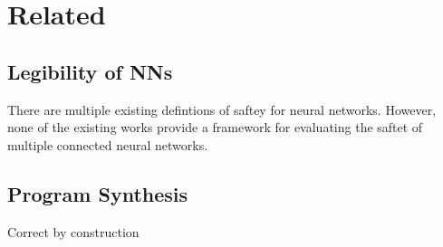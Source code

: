 
\section{Related}

\subsection{Legibility of NNs}
There are multiple existing defintions of saftey for neural networks.
However, none of the existing works provide a framework for evaluating the saftet of multiple connected neural networks.

\subsection{Program Synthesis}
Correct by construction


